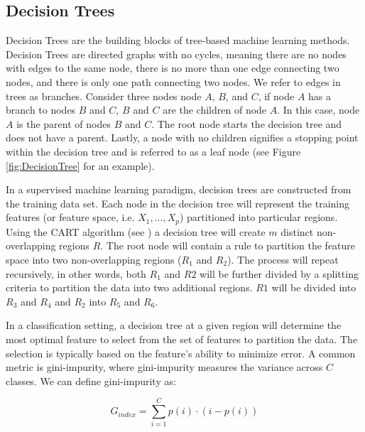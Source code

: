 \subsection{Decision Trees} \label{sec:DecisionTrees}

Decision Trees are the building blocks of tree-based machine learning methods.  Decision Trees are directed graphs with no cycles, meaning there are no nodes with edges to the same node, there is no more than one edge connecting two nodes, and there is only one path connecting two nodes.  We refer to edges in trees as branches.  Consider three nodes node \(A\),  \(B\), and \(C\), if node \(A\) has a branch to nodes \(B\) and \(C\),  \(B\) and \(C\) are the children of node \(A\). In this case, node \(A\) is the parent of nodes \(B\) and \(C\).  The root node starts the decision tree and does not have a parent.  Lastly, a node with no children signifies a stopping point  within the decision tree and is referred to as a leaf node (see Figure \ref{fig:DecisionTree} for an example).

In a supervised machine learning paradigm, decision trees are constructed from the training data set.  Each node in the decision tree will represent the training features (or feature space, i.e. \(X_1,...,X_p\)) partitioned into particular regions. Using the CART algorithm (see \cite{CART}) a decision tree will create \(m\) distinct non-overlapping regions \(R\). The root node will contain a rule to partition the feature space into two non-overlapping regions (\(R_1\) and \(R_2\)). The process will repeat recursively, in other words, both \(R_1\) and \(R2\) will be further divided by a splitting criteria to partition the data into two additional regions. \(R1\) will be divided into \(R_3\) and \(R_4\)  and \(R_2\) into  \(R_5\) and \(R_6\). 


In a classification setting, a decision tree at a given region will determine the most optimal feature to select from the set of features to partition the data.  The selection is typically based on the feature's ability to minimize error.  A common metric is gini-impurity, where gini-impurity measures the variance across \(C\) classes. We can define gini-impurity as: 

\begin{equation}
\label{eq:GiniImpurity}
G_{index} = \sum_{i=1}^{C} p(i) \cdot (i - p(i))
\end{equation}

